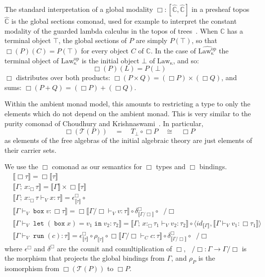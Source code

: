 \documentclass[acmsmall, screen, review, anonymous]{acmart}
\theoremstyle{definition}
\newcommand{\glob}{\mathop{\Box}}
\newcommand{\cat}{\mathbb{C}}
\newcommand{\psh}{\widehat{\cat}}
\newcommand{\terminal}{\top}
\newcommand{\initial}{\bot}
\newcommand{\lawc}{\mathrm{Law_{\kappa}}}
\newcommand{\lawcop}{\mathrm{Law_{\kappa}^{op}}}
\newcommand{\pshlawcop}{\widehat{\lawcop}}
\newcommand{\sem}[1]{\llbracket #1 \rrbracket}
\newcommand{\counit}[1]{\epsilon^{#1}}
\newcommand{\comult}[1]{\delta^{#1}}
\newcommand{\ununit}{\rho}
\newcommand{\mon}{\mathcal{T}}
\newcommand{\sndname}{\mathop{\pi_2}}
\newcommand{\snd}[1]{\sndname #1}
\newcommand{\types}{\mathrel{:}}
\newcommand{\gtypes}{\mathrel{:_{\Box}}}
\newcommand{\ccons}[2]{#1;\,#2}
\newcommand{\gbind}[3]{\ccons{#1}{#2\gtypes#3}}
\newcommand{\cdiv}[1]{#1/\Box}
\newcommand{\bdiv}[1]{\cdiv{\mathop{!_{#1}}}}
\newcommand{\gboxname}{\mathop{\mathtt{box}}}
\newcommand{\gbox}[1]{\gboxname #1}
\newcommand{\gunbox}[3]{\mathop{\mathtt{let}} (\gbox{#1}) = #2 \mathop{\mathtt{in}} #3}
\newcommand{\grunname}{\mathtt{run}}
\newcommand{\grun}[1]{\mathop{\grunname}(#1)}
\newcommand{\turnv}{\mathrel{\vdash_V}}
\newcommand{\turnc}{\mathrel{\vdash_C}}
\begin{document}
The standard interpretation of a global modality
$\glob \types [\psh, \psh]$ in a presheaf topos $\psh$ is the global
sections comonad, used for example to interpret the constant
modality of the guarded lambda calculus in the topos of
trees~\cite{clouston2016guarded}. When $\cat$ has a terminal object
$\terminal$, the global sections of $P$ are simply $P(\terminal)$, so
that $\glob(P)(C) = P(\terminal)$ for every object $C$ of $\cat$. In
the case of $\pshlawcop$ the terminal object of $\lawcop$ is the
initial object $\initial$ of $\lawc$, and so:
\begin{equation*}
\glob(P)(L) = P(\initial)
\end{equation*}
$\glob$ distributes over both products:
$\glob (P \times Q) = (\glob P) \times (\glob Q)$, and sums:
$\glob (P + Q) = (\glob P) + (\glob Q)$.

Within the ambient monad model, this amounts to restricting a type to
only the elements which do not depend on the ambient monad. This is very
similar to the purity comonad of Choudhury and
Krishnaswami~\cite{choudhury2020recovering}. In particular,
\begin{equation*}
  \glob (\mon(P)) \quad = \quad T_{\initial} \circ \glob P
  \quad \cong \quad \glob P
\end{equation*}
as elements of the free algebras of the initial algebraic theory are
just elements of their carrier sets.

We use the $\glob$ comonad as our semantics for $\glob$ types and
$\glob$ bindings.
\begin{align*}
&\sem{\glob \tau} = \glob \sem{\tau} \\
&\sem{\gbind{\Gamma}{x}{\tau}} = \sem{\Gamma} \times \glob \sem{\tau} \\
&\sem{\gbind{\Gamma}{x}{\tau} \turnv x \types \tau} = \counit{\glob}_{\sem{\tau}} \circ \snd \\
&\sem{\Gamma \turnv \gbox{v} \types \glob \tau} =
  \glob \sem{\cdiv{\Gamma} \turnv v \types \tau}
  \circ \comult{\glob}_{\sem{\cdiv{\Gamma}}} \circ \bdiv{\Gamma} \\
&\sem{\Gamma \turnv \gunbox{x}{v_1}{v_2} \types \tau_2} =
  \sem{\gbind{\Gamma}{x}{\tau_1} \turnv v_2 \types \tau_2}
  \circ \langle id_{\sem{\Gamma}},
                \sem{\Gamma \turnv v_1 \types \glob \tau_1} \rangle \\
&\sem{\Gamma \turnv \grun{c} \types \tau} =
  \counit{\glob}_{\sem{\tau}} \circ \ununit_{\sem{\tau}}
  \circ \glob \sem{\cdiv{\Gamma} \turnc c \types \tau}
  \circ \comult{\glob}_{\sem{\cdiv{\Gamma}}} \circ \bdiv{\Gamma}
\end{align*}
where $\counit{\glob}$ and $\comult{\glob}$ are the counit and
comultiplication of $\glob$,
$\bdiv{\Gamma} \types \Gamma \rightarrow \cdiv{\Gamma}$ is the morphism
that projects the global bindings from $\Gamma$, and $\ununit_P$ is the
isomorphism from $\glob (\mon(P))$ to $\glob P$.
\end{document}
